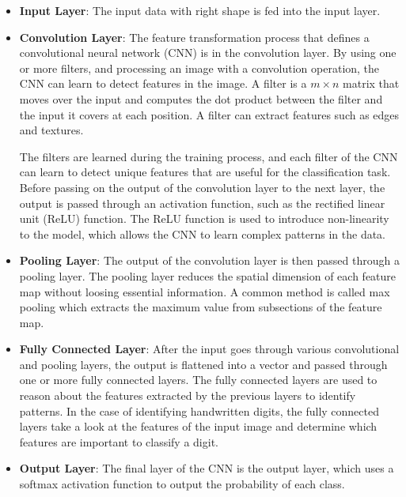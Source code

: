 \begin{itemize}
    \item \textbf{Input Layer}: The input data with right shape is fed into the input layer.
    \item \textbf{Convolution Layer}: The feature transformation process that defines a convolutional neural network (CNN) is in the convolution layer. By using one or more filters, and processing an image with a convolution operation, the CNN can learn to detect features in the image. A filter is a $m \times n$ matrix that moves over the input and computes the dot product between the filter and the input it covers at each position. A filter can extract features such as edges and textures. 
    \par
    The filters are learned during the training process, and each filter of the CNN can learn to detect unique features that are useful for the classification task. Before passing on the output of the convolution layer to the next layer, the output is passed through an activation function, such as the rectified linear unit (ReLU) function. The ReLU function is used to introduce non-linearity to the model, which allows the CNN to learn complex patterns in the data.
    \item \textbf{Pooling Layer}: The output of the convolution layer is then passed through a pooling layer. The pooling layer reduces the spatial dimension of each feature map without loosing essential information. A common method is called max pooling which extracts the maximum value from subsections of the feature map.
    \item \textbf{Fully Connected Layer}: After the input goes through various convolutional and pooling layers, the output is flattened into a vector and passed through one or more fully connected layers. The fully connected layers are used to reason about the features extracted by the previous layers to identify patterns. In the case of identifying handwritten digits, the fully connected layers take a look at the features of the input image and determine which features are important to classify a digit.
    \item \textbf{Output Layer}: The final layer of the CNN is the output layer, which uses a softmax activation function to output the probability of each class. 
\end{itemize}

